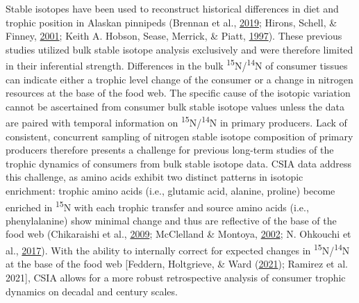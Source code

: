 \documentclass [11pt, proquest] {uwthesis}[2015/03/03]
\begin{document}
Stable isotopes have been used to reconstruct historical differences in
diet and trophic position in Alaskan pinnipeds (Brennan et al.,
\protect\hyperlink{ref-Brennan2019}{2019}; Hirons, Schell, \& Finney,
\protect\hyperlink{ref-Hirons2001}{2001}; Keith A. Hobson, Sease,
Merrick, \& Piatt, \protect\hyperlink{ref-Hobson1997}{1997}). These
previous studies utilized bulk stable isotope analysis exclusively and
were therefore limited in their inferential strength. Differences in the
bulk \textsuperscript{15}N/\textsuperscript{14}N of consumer tissues can
indicate either a trophic level change of the consumer or a change in
nitrogen resources at the base of the food web. The specific cause of
the isotopic variation cannot be ascertained from consumer bulk stable
isotope values unless the data are paired with temporal information on
\textsuperscript{15}N/\textsuperscript{14}N in primary producers. Lack
of consistent, concurrent sampling of nitrogen stable isotope
composition of primary producers therefore presents a challenge for
previous long-term studies of the trophic dynamics of consumers from
bulk stable isotope data. CSIA data address this challenge, as amino
acids exhibit two distinct patterns in isotopic enrichment: trophic
amino acids (i.e., glutamic acid, alanine, proline) become enriched in
\textsuperscript{15}N with each trophic transfer and source amino acids
(i.e., phenylalanine) show minimal change and thus are reflective of the
base of the food web (Chikaraishi et al.,
\protect\hyperlink{ref-Chikaraishi2009}{2009}; McClelland \& Montoya,
\protect\hyperlink{ref-McClelland2002}{2002}; N. Ohkouchi et al.,
\protect\hyperlink{ref-Ohkouchi2017}{2017}). With the ability to
internally correct for expected changes in
\textsuperscript{15}N/\textsuperscript{14}N at the base of the food web
{[}Feddern, Holtgrieve, \& Ward
(\protect\hyperlink{ref-Feddern2021}{2021}); Ramirez et al. 2021{]},
CSIA allows for a more robust retrospective analysis of consumer trophic
dynamics on decadal and century scales.
\end{document}
